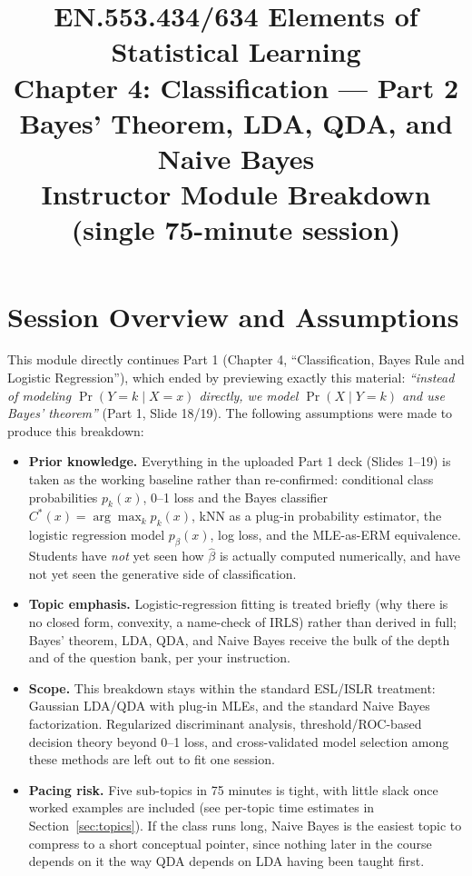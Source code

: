 \documentclass[11pt]{article}
\title{EN.553.434/634 Elements of Statistical Learning\\
Chapter 4: Classification --- Part 2\\
\large Bayes' Theorem, LDA, QDA, and Naive Bayes\\
\normalsize Instructor Module Breakdown (single 75-minute session)}
\author{}
\date{}
\begin{document}
\maketitle
\tableofcontents
\newpage

\section*{Session Overview and Assumptions}

This module directly continues Part 1 (Chapter 4, ``Classification, Bayes Rule and Logistic Regression''), which ended by previewing exactly this material: \emph{``instead of modeling $\Pr(Y=k\mid X=x)$ directly, we model $\Pr(X\mid Y=k)$ and use Bayes' theorem''} (Part 1, Slide 18/19). The following assumptions were made to produce this breakdown:

\begin{itemize}
\item \textbf{Prior knowledge.} Everything in the uploaded Part 1 deck (Slides 1--19) is taken as the working baseline rather than re-confirmed: conditional class probabilities $p_k(x)$, 0--1 loss and the Bayes classifier $C^*(x)=\arg\max_k p_k(x)$, kNN as a plug-in probability estimator, the logistic regression model $p_\beta(x)$, log loss, and the MLE-as-ERM equivalence. Students have \emph{not} yet seen how $\hat\beta$ is actually computed numerically, and have not yet seen the generative side of classification.
\item \textbf{Topic emphasis.} Logistic-regression fitting is treated briefly (why there is no closed form, convexity, a name-check of IRLS) rather than derived in full; Bayes' theorem, LDA, QDA, and Naive Bayes receive the bulk of the depth and of the question bank, per your instruction.
\item \textbf{Scope.} This breakdown stays within the standard ESL/ISLR treatment: Gaussian LDA/QDA with plug-in MLEs, and the standard Naive Bayes factorization. Regularized discriminant analysis, threshold/ROC-based decision theory beyond 0--1 loss, and cross-validated model selection among these methods are left out to fit one session.
\item \textbf{Pacing risk.} Five sub-topics in 75 minutes is tight, with little slack once worked examples are included (see per-topic time estimates in Section~\ref{sec:topics}). If the class runs long, Naive Bayes is the easiest topic to compress to a short conceptual pointer, since nothing later in the course depends on it the way QDA depends on LDA having been taught first.
\end{itemize}
\end{document}
